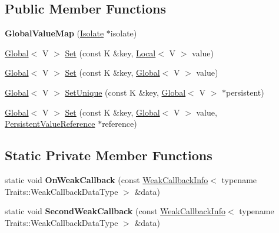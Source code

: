 \subsection*{Public Member Functions}
\begin{DoxyCompactItemize}
\item 
{\bfseries Global\+Value\+Map} (\hyperlink{classv8_1_1_isolate}{Isolate} $\ast$isolate)\hypertarget{classv8_1_1_global_value_map_a60018c72fdae03d51b687d2a941140f4}{}\label{classv8_1_1_global_value_map_a60018c72fdae03d51b687d2a941140f4}

\item 
\hyperlink{classv8_1_1_global}{Global}$<$ V $>$ \hyperlink{classv8_1_1_global_value_map_aa13f7914642c705b8e96824747ea115a}{Set} (const K \&key, \hyperlink{classv8_1_1_local}{Local}$<$ V $>$ value)
\item 
\hyperlink{classv8_1_1_global}{Global}$<$ V $>$ \hyperlink{classv8_1_1_global_value_map_ac2b02a0105393e6e3ab7e0aeeed9a294}{Set} (const K \&key, \hyperlink{classv8_1_1_global}{Global}$<$ V $>$ value)
\item 
\hyperlink{classv8_1_1_global}{Global}$<$ V $>$ \hyperlink{classv8_1_1_global_value_map_aad73de3912571a2f245454d3edea4a41}{Set\+Unique} (const K \&key, \hyperlink{classv8_1_1_global}{Global}$<$ V $>$ $\ast$persistent)
\item 
\hyperlink{classv8_1_1_global}{Global}$<$ V $>$ \hyperlink{classv8_1_1_global_value_map_aaa5fa26f751c8608716ad5578cd6c1d0}{Set} (const K \&key, \hyperlink{classv8_1_1_global}{Global}$<$ V $>$ value, \hyperlink{classv8_1_1_persistent_value_map_base_1_1_persistent_value_reference}{Persistent\+Value\+Reference} $\ast$reference)
\end{DoxyCompactItemize}
\subsection*{Static Private Member Functions}
\begin{DoxyCompactItemize}
\item 
static void {\bfseries On\+Weak\+Callback} (const \hyperlink{classv8_1_1_weak_callback_info}{Weak\+Callback\+Info}$<$ typename Traits\+::\+Weak\+Callback\+Data\+Type $>$ \&data)\hypertarget{classv8_1_1_global_value_map_af56bf560957d616f34543a2e9d14ca60}{}\label{classv8_1_1_global_value_map_af56bf560957d616f34543a2e9d14ca60}

\item 
static void {\bfseries Second\+Weak\+Callback} (const \hyperlink{classv8_1_1_weak_callback_info}{Weak\+Callback\+Info}$<$ typename Traits\+::\+Weak\+Callback\+Data\+Type $>$ \&data)\hypertarget{classv8_1_1_global_value_map_ae01469ad24dd4bd95c02ee0eac68542f}{}\label{classv8_1_1_global_value_map_ae01469ad24dd4bd95c02ee0eac68542f}

\end{DoxyCompactItemize}
